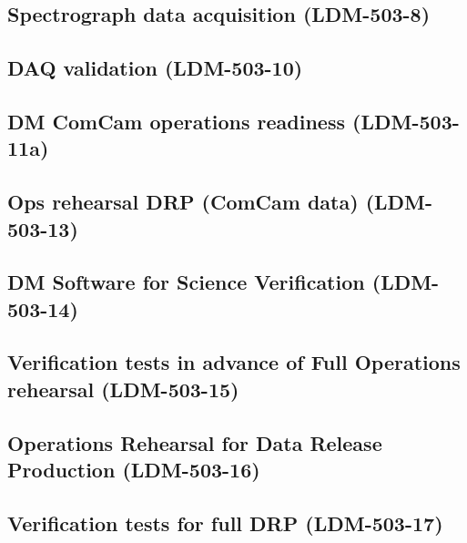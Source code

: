 \subsection{Spectrograph data acquisition \textbf{(LDM-503-8)}\label{LDM-503-8}}

\subsection{DAQ validation \textbf{(LDM-503-10)}\label{LDM-503-10}}

\subsection{DM ComCam operations readiness \textbf{(LDM-503-11a)}\label{LDM-503-11a}}

\subsection{Ops rehearsal DRP (ComCam data) \textbf{(LDM-503-13)}\label{LDM-503-13}}
\subsection{DM Software for Science Verification \textbf{(LDM-503-14)}\label{LDM-503-14}}
\subsection{Verification tests in advance of Full Operations rehearsal  \textbf{(LDM-503-15)}\label{LDM-503-15}}

\subsection{Operations Rehearsal for Data Release Production  \textbf{(LDM-503-16)}\label{LDM-503-16}}

\subsection{Verification tests for full DRP \textbf{(LDM-503-17)}\label{LDM-503-17}}

